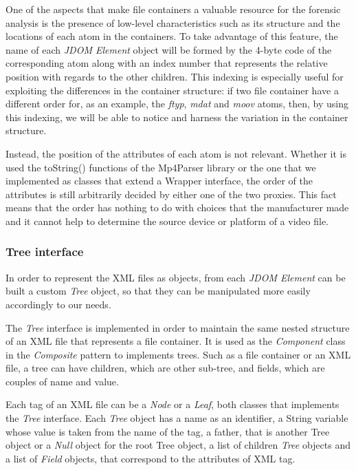 One of the aspects that make file containers a valuable resource for the forensic analysis is the presence of low-level characteristics such as its structure and the locations of each atom in the containers. To take advantage of this feature, the name of each \emph{JDOM Element} object will be formed by the 4-byte code of the corresponding atom along with an index number that represents the relative position with regards to the other children. This indexing is especially useful for exploiting the differences in the container structure: if two file container have a different order for, as an example, the \emph{ftyp}, \emph{mdat} and \emph{moov} atoms, then, by using this indexing, we will be able to notice and harness the variation in the container structure.

Instead, the position of the attributes of each atom is not relevant. Whether it is used the toString() functions of the Mp4Parser library or the one that we implemented as classes that extend a Wrapper interface, the order of the attributes is still arbitrarily decided by either one of the two proxies. This fact means that the order has nothing to do with choices that the manufacturer made and it cannot help to determine the source device or platform of a video file.

\subsubsection{Tree interface}

In order to represent the XML files as objects, from each \emph{JDOM Element} can be built a custom \emph{Tree} object, so that they can be manipulated more easily accordingly to our needs.

The \emph{Tree} interface is implemented in order to maintain the same nested structure of an XML file that represents a file container. It is used as the \emph{Component} class in the \emph{Composite} pattern to implements trees. Such as a file container or an XML file, a tree can have children, which are other sub-tree, and fields, which are couples of name and value.

Each tag of an XML file can be a \emph{Node} or a \emph{Leaf}, both classes that implements the \emph{Tree} interface. Each \emph{Tree} object has a name as an identifier, a String variable whose value is taken from the name of the tag, a father, that is another Tree object or a \emph{Null} object for the root Tree object, a list of children \emph{Tree} objects and a list of \emph{Field} objects, that correspond to the attributes of XML tag.

